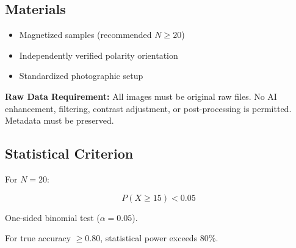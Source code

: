 \documentclass[11pt,a4paper]{article}
\begin{document}
\subsection*{Materials}

\begin{itemize}
\item Magnetized samples (recommended $N \ge 20$)
\item Independently verified polarity orientation
\item Standardized photographic setup
\end{itemize}

\textbf{Raw Data Requirement:}  
All images must be original raw files. No AI enhancement, filtering, contrast adjustment, or post-processing is permitted. Metadata must be preserved.

\subsection*{Statistical Criterion}

For $N=20$:

\[
P(X \ge 15) < 0.05
\]

One-sided binomial test ($\alpha = 0.05$).

For true accuracy $\ge 0.80$, statistical power exceeds 80\%.



\end{document}

